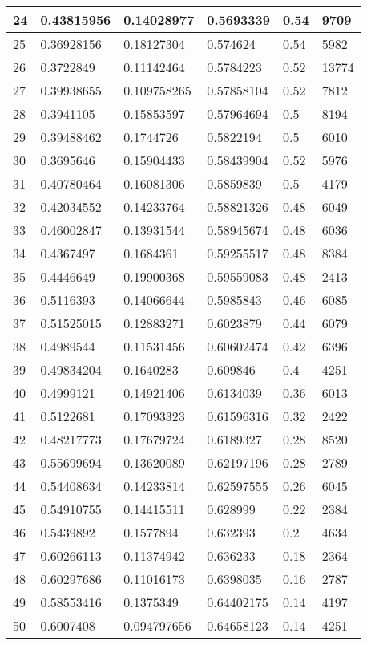 \begin{longtable}{|l|l|l|l|l|l|}
24 & 0.43815956 & 0.14028977 & 0.5693339 & 0.54 & 9709 \\ \hline 
25 & 0.36928156 & 0.18127304 & 0.574624 & 0.54 & 5982 \\ \hline 
26 & 0.3722849 & 0.11142464 & 0.5784223 & 0.52 & 13774 \\ \hline 
27 & 0.39938655 & 0.109758265 & 0.57858104 & 0.52 & 7812 \\ \hline 
28 & 0.3941105 & 0.15853597 & 0.57964694 & 0.5 & 8194 \\ \hline 
29 & 0.39488462 & 0.1744726 & 0.5822194 & 0.5 & 6010 \\ \hline 
30 & 0.3695646 & 0.15904433 & 0.58439904 & 0.52 & 5976 \\ \hline 
31 & 0.40780464 & 0.16081306 & 0.5859839 & 0.5 & 4179 \\ \hline 
32 & 0.42034552 & 0.14233764 & 0.58821326 & 0.48 & 6049 \\ \hline 
33 & 0.46002847 & 0.13931544 & 0.58945674 & 0.48 & 6036 \\ \hline 
34 & 0.4367497 & 0.1684361 & 0.59255517 & 0.48 & 8384 \\ \hline 
35 & 0.4446649 & 0.19900368 & 0.59559083 & 0.48 & 2413 \\ \hline 
36 & 0.5116393 & 0.14066644 & 0.5985843 & 0.46 & 6085 \\ \hline 
37 & 0.51525015 & 0.12883271 & 0.6023879 & 0.44 & 6079 \\ \hline 
38 & 0.4989544 & 0.11531456 & 0.60602474 & 0.42 & 6396 \\ \hline 
39 & 0.49834204 & 0.1640283 & 0.609846 & 0.4 & 4251 \\ \hline 
40 & 0.4999121 & 0.14921406 & 0.6134039 & 0.36 & 6013 \\ \hline 
41 & 0.5122681 & 0.17093323 & 0.61596316 & 0.32 & 2422 \\ \hline 
42 & 0.48217773 & 0.17679724 & 0.6189327 & 0.28 & 8520 \\ \hline 
43 & 0.55699694 & 0.13620089 & 0.62197196 & 0.28 & 2789 \\ \hline 
44 & 0.54408634 & 0.14233814 & 0.62597555 & 0.26 & 6045 \\ \hline 
45 & 0.54910755 & 0.14415511 & 0.628999 & 0.22 & 2384 \\ \hline 
46 & 0.5439892 & 0.1577894 & 0.632393 & 0.2 & 4634 \\ \hline 
47 & 0.60266113 & 0.11374942 & 0.636233 & 0.18 & 2364 \\ \hline 
48 & 0.60297686 & 0.11016173 & 0.6398035 & 0.16 & 2787 \\ \hline 
49 & 0.58553416 & 0.1375349 & 0.64402175 & 0.14 & 4197 \\ \hline 
50 & 0.6007408 & 0.094797656 & 0.64658123 & 0.14 & 4251 \\ \hline 
\end{longtable}